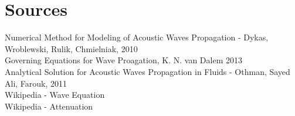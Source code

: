 \documentclass{article}
\begin{document}
\section{Sources}
Numerical Method for Modeling of Acoustic Waves Propagation - Dykas, Wroblewski, Rulik, Chmielniak, 2010\\
Governing Equations for Wave Proagation, K. N. van Dalem 2013\\
Analytical Solution for Acoustic Waves Propagation in Fluids - Othman, Sayed Ali, Farouk, 2011\\
Wikipedia - Wave Equation\\
Wikipedia - Attenuation\\




\end{document}
